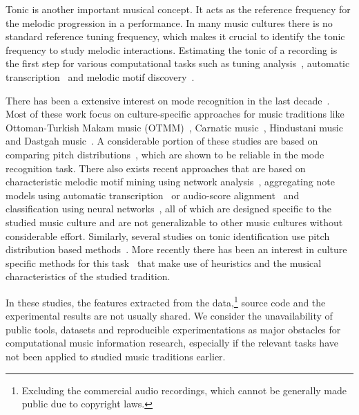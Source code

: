 \documentclass{sig-alternate}
\begin{document}
Tonic is another important musical concept. It acts as the reference frequency for the melodic progression in a performance. In many music cultures there is no standard reference tuning frequency, which makes it crucial to identify the tonic frequency to study melodic interactions. Estimating the tonic of a recording is the first step for various computational tasks such as tuning analysis~\cite{tuning}, automatic transcription~\cite{transcription} and melodic motif discovery~\cite{gulati_network}.

There has been a extensive interest on mode recognition in the last decade~\cite{koduri2012ragaReview}. Most of these work focus on culture-specific approaches for music traditions like Otto\-man-Turkish Makam music (OTMM)~\cite{bozkurt_makam}, Carnatic music~\cite{dighe, dighe2, gulati_network}, Hindustani music~\cite{chordia2, chordia,gulati2016raga} and Dastgah music~\cite{dastgah}. A considerable portion of these studies are based on comparing pitch distributions~\cite{chordia2, chordia, dighe, dighe2, bozkurt_makam}, which are shown to be reliable in the mode recognition task. There also exists recent approaches that are based on characteristic melodic motif mining using network analysis~\cite{gulati2016raga,gulati_network}, aggregating note models using automatic transcription~\cite{koduri2014intonation} or audio-score alignment~\cite{senturk2016noteModel_smc} and classification using neural networks~\cite{raga_mining, neural_raga_chapter}, all of which are designed specific to the studied music culture and are not generalizable to other music cultures without considerable effort. Similarly, several studies on tonic identification use pitch distribution based methods~\cite{bozkurt_tonic, chordia}. More recently there has been an interest in culture specific methods for this task~\cite{sercan_tonic, sankalp_tonic, senturk2013karar_ismir} that make use of heuristics and the musical characteristics of the studied tradition. 

In these studies, the features extracted from the data,\footnote{Excluding the commercial audio recordings, which cannot be generally made public due to copyright laws.} source code and the experimental results are not usually shared. We consider the unavailability of public tools, data\-sets and reproducible experimentations as major obstacles for computational music information research, especially if the relevant tasks have not been applied to studied music traditions earlier.
\end{document}
